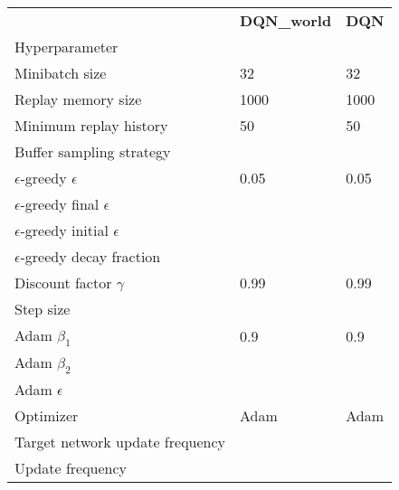 \begin{tabular}{lll}
 & \bfseries DQN_world & \bfseries DQN \\
Hyperparameter &  &  \\
Minibatch size & 32 & 32 \\
Replay memory size & 1000 & 1000 \\
Minimum replay history & 50 & 50 \\
Buffer sampling strategy &  &  \\
$\epsilon$-greedy $\epsilon$ & 0.05 & 0.05 \\
$\epsilon$-greedy final $\epsilon$ &  &  \\
$\epsilon$-greedy initial $\epsilon$ &  &  \\
$\epsilon$-greedy decay fraction &  &  \\
Discount factor $\gamma$ & 0.99 & 0.99 \\
Step size &  &  \\
Adam $\beta_1$ & 0.9 & 0.9 \\
Adam $\beta_2$ &  &  \\
Adam $\epsilon$ &  &  \\
Optimizer & Adam & Adam \\
Target network update frequency &  &  \\
Update frequency &  &  \\
\end{tabular}

